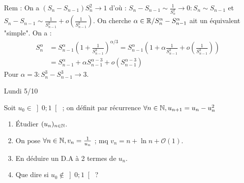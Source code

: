 \begin{solution}
\begin{remarkbox}
Rem : On a $(S_n - S_{n-1}) S_n^2 \to 1$ d'où :
$S_n - S_{n-1} \sim \frac{1}{S_n^2} \to 0 : S_n \sim S_{n-1}$ et $S_n - S_{n-1} \sim \frac{1}{S_{n-1}^2} + o\left(\frac{1}{S_{n-1}^2}\right)$.
On cherche $\alpha \in \mathbb R / S_n^\alpha - S_{n-1}^\alpha$ ait un équivalent "simple".
On a :
\begin{align*}
S_n^\alpha &= S_{n-1}^\alpha \left(1 + \frac{1}{S_{n-1}^3}\right)^{\alpha/3} = S_{n-1}^\alpha \left( 1 + \alpha \frac{1}{S_{n-1}^3} + o\left(\frac{1}{S_{n-1}^3}\right) \right) \\
&= S_{n-1}^\alpha + \alpha S_{n-1}^{\alpha-3} + o(S_{n-1}^{\alpha-3})
\end{align*}
Pour $\alpha = 3 : S_n^3 - S_{n-1}^3 \to 3$.
\end{remarkbox}
\end{solution}


\begin{statementbox}
Lundi 5/10

Soit $u_0 \in \left]0; 1\right[$ ; on définit par récurrence $\forall n \in \mathbb N, u_{n+1} = u_n - u_n^2$
\begin{enumerate}[label=\alph*.]
  \item Étudier $(u_n)_{n \in \mathbb N}$.
  \item On pose $\forall n \in \mathbb N, v_n = \frac{1}{u_n}$ ; mq $v_n = n + \ln n + \mathcal{O}(1)$.
  \item En déduire un D.A à 2 termes de $u_n$.
  \item Que dire si $u_0 \notin \left]0; 1\right[$ ?
\end{enumerate}
\end{statementbox}

